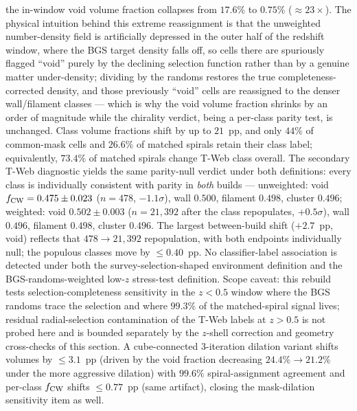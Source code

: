 \documentclass[twocolumn,linenumbers]{aastex702}
\begin{document}
the in-window void volume fraction collapses from $17.6\%$ to $0.75\%$
(${\approx}23\times$). The physical intuition behind this extreme
reassignment is that the unweighted number-density field is artificially
depressed in the outer half of the redshift window, where the BGS target
density falls off, so cells there are spuriously flagged ``void'' purely
by the declining selection function rather than by a genuine matter
under-density; dividing by the randoms restores the true completeness-
corrected density, and those previously ``void'' cells are reassigned to
the denser wall/filament classes --- which is why the void volume
fraction shrinks by an order of magnitude while the chirality verdict,
being a per-class parity test, is unchanged. Class volume fractions shift by up to $21$~pp,
and only $44\%$ of common-mask cells and $26.6\%$ of matched spirals
retain their class label; equivalently, $73.4\%$ of matched spirals change
T-Web class overall. The secondary T-Web diagnostic yields the same
parity-null verdict under both definitions: every class is individually consistent
with parity in \emph{both} builds --- unweighted: void
$f_{\rm CW} = 0.475 \pm 0.023$ ($n=478$, $-1.1\sigma$), wall $0.500$,
filament $0.498$, cluster $0.496$; weighted: void $0.502 \pm 0.003$
($n = 21{,}392$ after the class repopulates, $+0.5\sigma$), wall
$0.496$, filament $0.498$, cluster $0.496$. The largest between-build
shift ($+2.7$~pp, void) reflects that $478 \to 21{,}392$ repopulation,
with both endpoints individually null; the populous classes move by
$\le 0.40$~pp. No classifier-label association is detected
under both the survey-selection-shaped environment definition and the
BGS-randoms-weighted low-$z$ stress-test definition. Scope caveat: this rebuild tests
selection-completeness sensitivity in the $z<0.5$ window where the BGS
randoms trace the selection and where $99.3\%$ of the matched-spiral
signal lives; residual radial-selection contamination of the T-Web
labels at $z>0.5$ is not probed here and is bounded separately by the
$z$-shell correction and geometry cross-checks of this section. A
cube-connected 3-iteration dilation variant shifts volumes by
$\le 3.1$~pp (driven by the void fraction decreasing
$24.4\% \to 21.2\%$ under the more aggressive dilation) with $99.6\%$
spiral-assignment agreement and per-class $f_{\rm CW}$ shifts
$\le 0.77$~pp (same artifact), closing the mask-dilation sensitivity
item as well.
\end{document}
